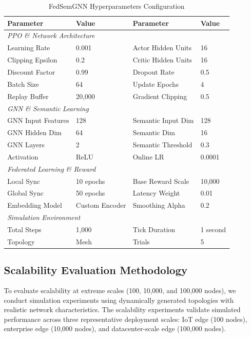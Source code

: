 \documentclass[conference]{IEEEtran}
\begin{document}
	\begin{table}[t]
		\centering
		\caption{FedSemGNN Hyperparameters Configuration}
		\label{tab:hyperparameters}
		\scriptsize
		\begin{tabular}{@{}llll@{}}
			\toprule
			\textbf{Parameter} & \textbf{Value} & \textbf{Parameter} & \textbf{Value} \\
			\midrule
			\multicolumn{4}{l}{\textit{PPO \& Network Architecture}} \\
			Learning Rate & 0.001 & Actor Hidden Units & 16 \\
			Clipping Epsilon & 0.2 & Critic Hidden Units & 16 \\
			Discount Factor & 0.99 & Dropout Rate & 0.5 \\
			Batch Size & 64 & Update Epochs & 4 \\
			Replay Buffer & 20,000 & Gradient Clipping & 0.5 \\
			\midrule
			\multicolumn{4}{l}{\textit{GNN \& Semantic Learning}} \\
			GNN Input Features & 128 & Semantic Input Dim & 128 \\
			GNN Hidden Dim & 64 & Semantic Dim & 16 \\
			GNN Layers & 2 & Semantic Threshold & 0.3 \\
			Activation & ReLU & Online LR & 0.0001 \\
			\midrule
			\multicolumn{4}{l}{\textit{Federated Learning \& Reward}} \\
			Local Sync & 10 epochs & Base Reward Scale & 10,000 \\
			Global Sync & 50 epochs & Latency Weight & 0.01 \\
			Embedding Model & Custom Encoder & Smoothing Alpha & 0.2 \\
			\midrule
			\multicolumn{4}{l}{\textit{Simulation Environment}} \\
			Total Steps & 1,000 & Tick Duration & 1 second \\
			Topology & Mesh & Trials & 5 \\
			\bottomrule
		\end{tabular}
	\end{table}
	
	\subsection{Scalability Evaluation Methodology}
	To evaluate scalability at extreme scales (100, 10,000, and 100,000 nodes), we conduct simulation experiments using dynamically generated topologies with realistic network characteristics. The scalability experiments validate simulated performance across three representative deployment scales: IoT edge (100 nodes), enterprise edge (10,000 nodes), and datacenter-scale edge (100,000 nodes).
	
\end{document}
